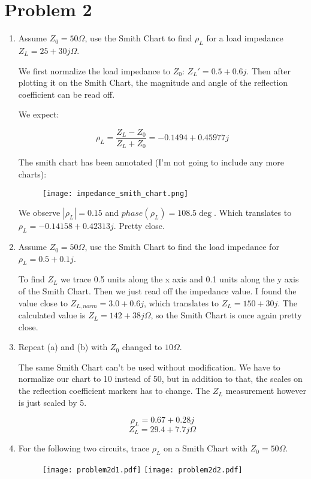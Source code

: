 \section*{Problem 2}
\begin{enumerate}[label=(\alph*)]
    \item Assume $Z_0 = 50\Omega$, use the Smith Chart to find $\rho_L$ for a load impedance $Z_L = 25 + 30j \Omega$.

    We first normalize the load impedance to $Z_0$: $Z_L' = 0.5 + 0.6j$. Then after plotting it on the Smith Chart, the magnitude and angle of the reflection coefficient can be read off.

    We expect:

    $$ \rho_L = \frac{Z_L - Z_0}{Z_L + Z_0} = -0.1494+0.45977j $$

    The smith chart has been annotated (I'm not going to include any more charts):

    \begin{figure}[H]
        \centering \texttt{[image: impedance\_smith\_chart.png]}
    \end{figure}

    We observe $|\rho_L| = 0.15$ and $phase(\rho_L) = 108.5 \deg$. Which translates to $\rho_L = -0.14158 + 0.42313j$. Pretty close.

    \item Assume $Z_0 = 50 \Omega$, use the Smith Chart to find the load impedance for $\rho_L = 0.5 + 0.1j$.

    To find $Z_L$ we trace 0.5 units along the x axis and 0.1 units along the y axis of the Smith Chart. Then we just read off the impedance value. I found the value close to $Z_{L,norm} = 3.0 + 0.6j$, which translates to $Z_L = 150 + 30j$. The calculated value is $Z_L = 142 + 38j \Omega$, so the Smith Chart is once again pretty close.

    \item Repeat (a) and (b) with $Z_0$ changed to $10\Omega$.

    The same Smith Chart can't be used without modification. We have to normalize our chart to 10 instead of 50, but in addition to that, the scales on the reflection coefficient markers has to change. The $Z_L$ measurement however is just scaled by 5.

    $$ \rho_L = 0.67 + 0.28j $$
    $$ Z_L = 29.4 + 7.7j \Omega $$

    \item For the following two circuits, trace $\rho_L$ on a Smith Chart with $Z_0 = 50\Omega$.

    \begin{figure}[H]
        \centering \texttt{[image: problem2d1.pdf]}
        \centering \texttt{[image: problem2d2.pdf]}
    \end{figure}
\end{enumerate}

